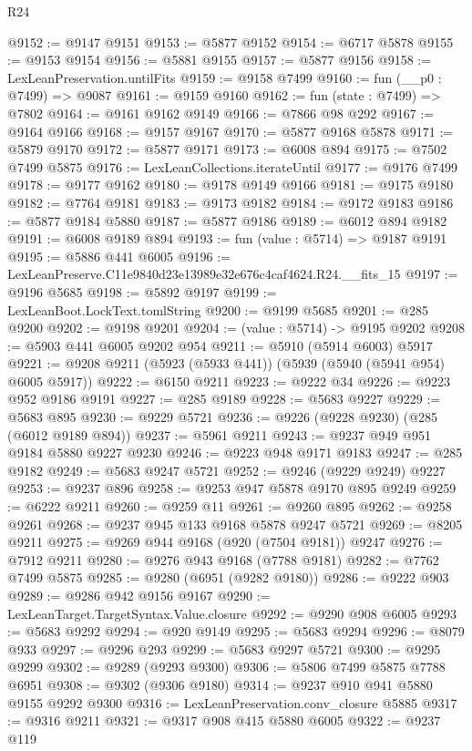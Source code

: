 \begin{lexlean}{R24}
\begin{coremodule}
@9152 := @9147 @9151
@9153 := @5877 @9152
@9154 := @6717 @5878
@9155 := @9153 @9154
@9156 := @5881 @9155
@9157 := @5877 @9156
@9158 := LexLeanPreservation.untilFits
@9159 := @9158 @7499
@9160 := fun (__p0 : @7499) => @9087
@9161 := @9159 @9160
@9162 := fun (state : @7499) => @7802
@9164 := @9161 @9162 @9149
@9166 := @7866 @98 @292
@9167 := @9164 @9166
@9168 := @9157 @9167
@9170 := @5877 @9168 @5878
@9171 := @5879 @9170
@9172 := @5877 @9171
@9173 := @6008 @894
@9175 := @7502 @7499 @5875
@9176 := LexLeanCollections.iterateUntil
@9177 := @9176 @7499
@9178 := @9177 @9162
@9180 := @9178 @9149 @9166
@9181 := @9175 @9180
@9182 := @7764 @9181
@9183 := @9173 @9182
@9184 := @9172 @9183
@9186 := @5877 @9184 @5880
@9187 := @5877 @9186
@9189 := @6012 @894 @9182
@9191 := @6008 @9189 @894
@9193 := fun (value : @5714) => @9187 @9191
@9195 := @5886 @441 @6005
@9196 := LexLeanPreserve.C11e9840d23e13989e32e676c4caf4624.R24.__fits_15
@9197 := @9196 @5685
@9198 := @5892 @9197
@9199 := LexLeanBoot.LockText.tomlString
@9200 := @9199 @5685
@9201 := @285 @9200
@9202 := @9198 @9201
@9204 := (value : @5714) -> @9195 @9202
@9208 := @5903 @441 @6005 @9202 @954
@9211 := @5910 (@5914 @6003) @5917
@9221 := @9208 @9211 (@5923 (@5933 @441)) (@5939 (@5940 (@5941 @954) @6005 @5917))
@9222 := @6150 @9211
@9223 := @9222 @34
@9226 := @9223 @952 @9186 @9191
@9227 := @285 @9189
@9228 := @5683 @9227
@9229 := @5683 @895
@9230 := @9229 @5721
@9236 := @9226 (@9228 @9230) (@285 (@6012 @9189 @894))
@9237 := @5961 @9211
@9243 := @9237 @949 @951 @9184 @5880 @9227 @9230
@9246 := @9223 @948 @9171 @9183
@9247 := @285 @9182
@9249 := @5683 @9247 @5721
@9252 := @9246 (@9229 @9249) @9227
@9253 := @9237 @896
@9258 := @9253 @947 @5878 @9170 @895 @9249
@9259 := @6222 @9211
@9260 := @9259 @11
@9261 := @9260 @895
@9262 := @9258 @9261
@9268 := @9237 @945 @133 @9168 @5878 @9247 @5721
@9269 := @8205 @9211
@9275 := @9269 @944 @9168 (@920 (@7504 @9181)) @9247
@9276 := @7912 @9211
@9280 := @9276 @943 @9168 (@7788 @9181)
@9282 := @7762 @7499 @5875
@9285 := @9280 (@6951 (@9282 @9180))
@9286 := @9222 @903
@9289 := @9286 @942 @9156 @9167
@9290 := LexLeanTarget.TargetSyntax.Value.closure
@9292 := @9290 @908 @6005
@9293 := @5683 @9292
@9294 := @920 @9149
@9295 := @5683 @9294
@9296 := @8079 @933
@9297 := @9296 @293
@9299 := @5683 @9297 @5721
@9300 := @9295 @9299
@9302 := @9289 (@9293 @9300)
@9306 := @5806 @7499 @5875 @7788 @6951
@9308 := @9302 (@9306 @9180)
@9314 := @9237 @910 @941 @5880 @9155 @9292 @9300
@9316 := LexLeanPreservation.conv_closure @5885
@9317 := @9316 @9211
@9321 := @9317 @908 @415 @5880 @6005
@9322 := @9237 @119

\end{coremodule}
\end{lexlean}
